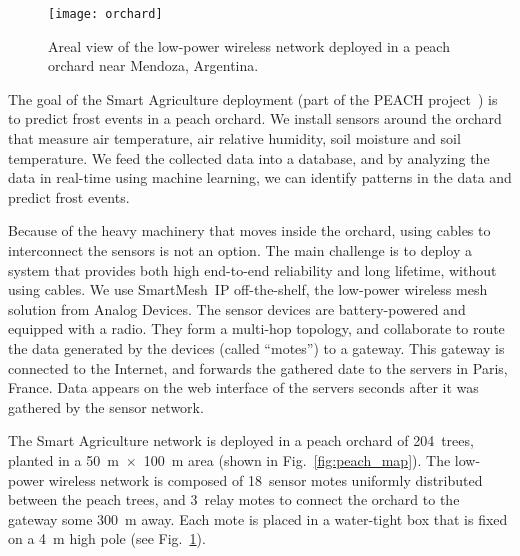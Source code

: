 \documentclass{elsarticle}
\newcommand{\smip}                {SmartMesh~IP\xspace}
\newcommand{\agri}                {Smart Agriculture\xspace}
\begin{document}
\begin{figure}
    \centering
    \texttt{[image: orchard]}
    \caption{Areal view of the low-power wireless network deployed in a peach orchard near Mendoza, Argentina.}
    \label{fig:orchard}
\end{figure}


The goal of the \agri deployment (part of the PEACH project~\cite{watteyne16peach}) is to predict frost events in a peach orchard.
We install sensors around the orchard that measure air temperature, air relative humidity, soil moisture and soil temperature.
We feed the collected data into a database, and by analyzing the data in real-time using machine learning, we can identify patterns in the data and predict frost events.


Because of the heavy machinery that moves inside the orchard, using cables to interconnect the sensors is not an option.
The main challenge is to deploy a system that provides both high end-to-end reliability and long lifetime, without using cables.
We use \smip off-the-shelf, the low-power wireless mesh solution from Analog Devices.
The sensor devices are battery-powered and equipped with a radio.
They form a multi-hop topology, and collaborate to route the data generated by the devices (called ``motes'') to a gateway.
This gateway is connected to the Internet, and forwards the gathered date to the servers in Paris, France.
Data appears on the web interface of the servers seconds after it was gathered by the sensor network.


The \agri network is deployed in a peach orchard of 204~trees, planted in a 50~m~$\times$~100~m area (shown in Fig.~\ref{fig:peach_map}).
The low-power wireless network is composed of 18~sensor motes uniformly distributed between the peach trees, and 3~relay motes to connect the orchard to the gateway some 300~m away.
Each mote is placed in a water-tight box that is fixed on a 4~m high pole (see Fig.~\ref{fig:orchard}).
\end{document}
